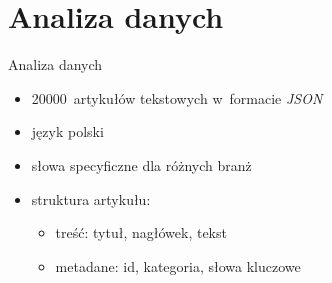 \documentclass{beamer}
\begin{document}
	\section{Analiza danych}
	\begin{frame}{Analiza danych}
		\begin{itemize}
			\setlength\itemsep{2em}
			\item 20000~artykułów tekstowych w~formacie \textit{JSON}
			\item język polski
			\item słowa specyficzne dla różnych branż
			\item struktura artykułu:
			\begin{itemize}
				\item treść: tytuł, nagłówek, tekst
				\item metadane: id, kategoria, słowa kluczowe
			\end{itemize}
		\end{itemize}
	\end{frame}
\end{document}
